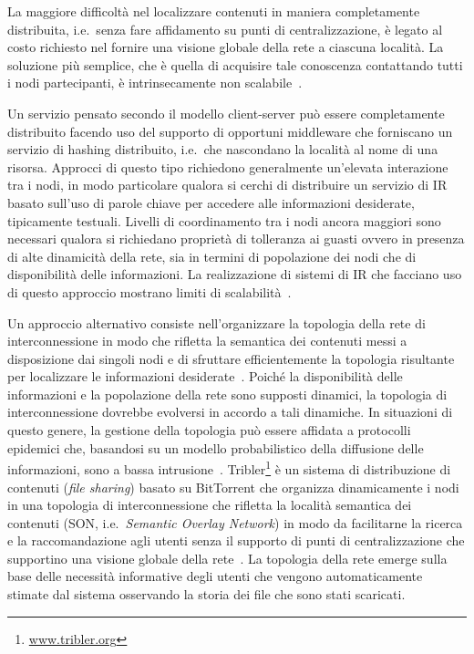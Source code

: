 La maggiore difficoltà nel localizzare contenuti in maniera completamente distribuita, i.e.\ senza fare affidamento su punti di centralizzazione, è legato al costo richiesto nel fornire una visione globale della rete a ciascuna località. La soluzione più semplice, che è quella di acquisire tale conoscenza contattando tutti i nodi partecipanti, è intrinsecamente non scalabile~\cite{CRB+03}.

Un servizio pensato secondo il modello client-server può essere completamente distribuito facendo uso del supporto di opportuni middleware che forniscano un servizio di hashing distribuito, i.e.\ che nascondano la località al nome di una risorsa. Approcci di questo tipo richiedono generalmente un'elevata interazione tra i nodi, in modo particolare qualora si cerchi di distribuire un servizio di IR basato sull'uso di parole chiave per accedere alle informazioni desiderate, tipicamente testuali. Livelli di coordinamento tra i nodi ancora maggiori sono necessari qualora si richiedano proprietà di tolleranza ai guasti ovvero in presenza di alte dinamicità della rete, sia in termini di popolazione dei nodi che di disponibilità delle informazioni. La realizzazione di sistemi di IR che facciano uso di questo approccio mostrano limiti di scalabilità~\cite{RV03, LLH+03}.

Un approccio alternativo consiste nell'organizzare la topologia della rete di interconnessione in modo che rifletta la semantica dei contenuti messi a disposizione dai singoli nodi e di sfruttare efficientemente la topologia risultante per localizzare le informazioni desiderate~\cite{RM06}. Poiché la disponibilità delle informazioni e la popolazione della rete sono supposti dinamici, la topologia di interconnessione dovrebbe evolversi in accordo a tali dinamiche. In situazioni di questo genere, la gestione della topologia può essere affidata a protocolli epidemici che, basandosi su un modello probabilistico della diffusione delle informazioni, sono a bassa intrusione~\cite{VS05}. Tribler\footnote{\url{www.tribler.org}} è un sistema di distribuzione di contenuti (\textit{file sharing}) basato su BitTorrent che organizza dinamicamente i nodi in una topologia di interconnessione che rifletta la località semantica dei contenuti (SON, i.e.\ \textit{Semantic Overlay Network}) in modo da facilitarne la ricerca e la raccomandazione agli utenti senza il supporto di punti di centralizzazione che supportino una visione globale della rete~\cite{PGW+08}. La topologia della rete emerge sulla base delle necessità informative degli utenti che vengono automaticamente stimate dal sistema osservando la storia dei file che sono stati scaricati.


